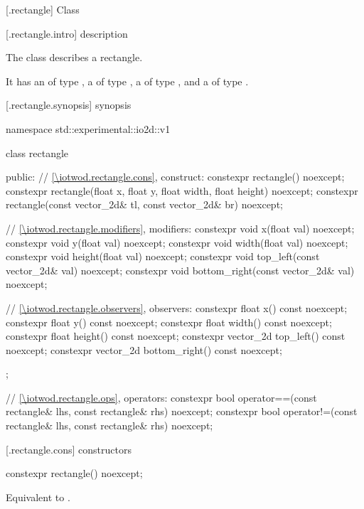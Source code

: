  [\iotwod.rectangle] {Class }

 [\iotwod.rectangle.intro] { description}

%
\pnum
The class  describes a rectangle.

\pnum
It has an  of type , a  of type , a  of type , and a  of type .

 [\iotwod.rectangle.synopsis] { synopsis}

\begin{codeblock}
namespace std::experimental::io2d::v1 {
  class rectangle {
  public:
    // \ref{\iotwod.rectangle.cons}, construct:
    constexpr rectangle() noexcept;
    constexpr rectangle(float x, float y, float width, float height)
      noexcept;
    constexpr rectangle(const vector_2d& tl, const vector_2d& br) noexcept;

    // \ref{\iotwod.rectangle.modifiers}, modifiers:
    constexpr void x(float val) noexcept;
    constexpr void y(float val) noexcept;
    constexpr void width(float val) noexcept;
    constexpr void height(float val) noexcept;
    constexpr void top_left(const vector_2d& val) noexcept;
    constexpr void bottom_right(const vector_2d& val) noexcept;
    
    // \ref{\iotwod.rectangle.observers}, observers:
    constexpr float x() const noexcept;
    constexpr float y() const noexcept;
    constexpr float width() const noexcept;
    constexpr float height() const noexcept;
    constexpr vector_2d top_left() const noexcept;
    constexpr vector_2d bottom_right() const noexcept;
  };
  
  // \ref{\iotwod.rectangle.ops}, operators:
  constexpr bool operator==(const rectangle& lhs, const rectangle& rhs) 
    noexcept;
  constexpr bool operator!=(const rectangle& lhs, const rectangle& rhs) 
    noexcept;
}
\end{codeblock}

 [\iotwod.rectangle.cons] { constructors}

%
\begin{itemdecl}
constexpr rectangle() noexcept;
\end{itemdecl}
\begin{itemdescr}
\pnum
\effects
Equivalent to .
\end{itemdescr}

